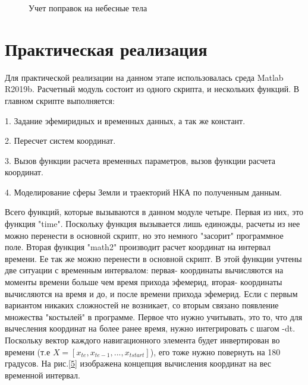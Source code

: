 \documentclass[]{article}
\begin{document}
\begin{figure}[h!]
	
	\caption{Учет поправок на небесные тела }
	\label{4}
\end{figure}

\section{Практическая реализация}

Для практической реализации на данном этапе использовалась среда Matlab R2019b. Расчетный модуль состоит из одного скрипта, и нескольких функций. 
В главном скрипте выполняется:

1. Задание эфемиридных и временных данных, а так же констант.

2. Пересчет систем координат.

3. Вызов функции расчета временных параметров, вызов функции расчета координат.

4. Моделирование сферы Земли и траекторий НКА по полученным данным.

Всего функций, которые вызываются в данном модуле четыре.
Первая из них, это функция "time". Поскольку функция вызывается лишь единожды, расчеты из нее можно перенести в основной скрипт, но это немного "засорит" программное поле.
Вторая функция "math2" производит расчет координат на интервал времени. Ее так же можно перенести в основной скрипт. В этой функции учтены две ситуации с временным интервалом:
первая- координаты вычисляются на моменты времени больше чем время прихода эфемерид, вторая- координаты вычисляются на время и до, и после времени прихода эфемерид. Если с первым вариантом никаких сложностей не возникает, со вторым связано появление множества "костылей" в программе. Первое что нужно учитывать, это то, что для вычесления координат на более ранее время, нужно интегрировать с шагом -dt. Поскольку вектор каждого навигационного элемента будет инвертирован во времени (т.е $ X=[x_{te}, x_{te-1},...,x_{tstart}]$), его тоже нужно повернуть на 180 градусов. 
На рис.\ref{5} изображена концепция вычисления координат на вес временной интервал. 
\end{document}
